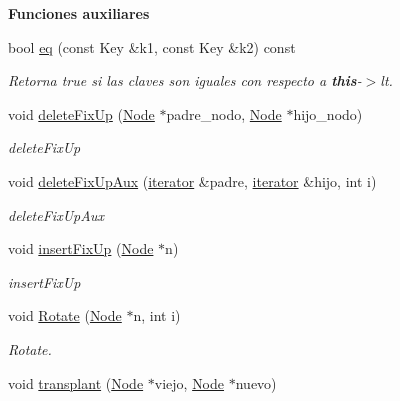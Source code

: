 \begin{Indent}{\bf Funciones auxiliares}\par
\begin{DoxyCompactItemize}
\item 
bool \hyperlink{classaed2_1_1map_ab45cb28bb215cd229383d88b96b3f624_ab45cb28bb215cd229383d88b96b3f624}{eq} (const Key \&k1, const Key \&k2) const 
\begin{DoxyCompactList}\small\item\em Retorna true si las claves son iguales con respecto a {\bfseries this}-\/$>$lt. \end{DoxyCompactList}\item 
void \hyperlink{classaed2_1_1map_a8fc6c73e0fcd59ae86887300b7287d9f_a8fc6c73e0fcd59ae86887300b7287d9f}{delete\+Fix\+Up} (\hyperlink{structaed2_1_1map_1_1Node}{Node} $\ast$padre\+\_\+nodo, \hyperlink{structaed2_1_1map_1_1Node}{Node} $\ast$hijo\+\_\+nodo)
\begin{DoxyCompactList}\small\item\em delete\+Fix\+Up \end{DoxyCompactList}\item 
void \hyperlink{classaed2_1_1map_a2232d7746c01c5b9ee6d84d0719416b4_a2232d7746c01c5b9ee6d84d0719416b4}{delete\+Fix\+Up\+Aux} (\hyperlink{classaed2_1_1map_1_1iterator}{iterator} \&padre, \hyperlink{classaed2_1_1map_1_1iterator}{iterator} \&hijo, int i)
\begin{DoxyCompactList}\small\item\em delete\+Fix\+Up\+Aux \end{DoxyCompactList}\item 
void \hyperlink{classaed2_1_1map_a5a0e59badb0c55114e2fcce75437e4cd_a5a0e59badb0c55114e2fcce75437e4cd}{insert\+Fix\+Up} (\hyperlink{structaed2_1_1map_1_1Node}{Node} $\ast$n)
\begin{DoxyCompactList}\small\item\em insert\+Fix\+Up \end{DoxyCompactList}\item 
void \hyperlink{classaed2_1_1map_a54b1ea9f8c707232c744a4ac5c5302d2_a54b1ea9f8c707232c744a4ac5c5302d2}{Rotate} (\hyperlink{structaed2_1_1map_1_1Node}{Node} $\ast$n, int i)
\begin{DoxyCompactList}\small\item\em Rotate. \end{DoxyCompactList}\item 
void \hyperlink{classaed2_1_1map_aa7babdedd4e32da6bf7f8262ccfe8fa6_aa7babdedd4e32da6bf7f8262ccfe8fa6}{transplant} (\hyperlink{structaed2_1_1map_1_1Node}{Node} $\ast$viejo, \hyperlink{structaed2_1_1map_1_1Node}{Node} $\ast$nuevo)

\end{DoxyCompactItemize}
\end{Indent}
